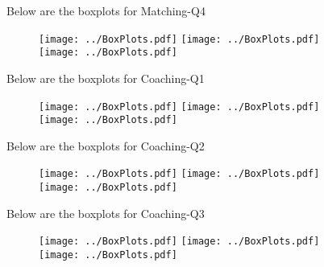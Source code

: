 \documentclass[11pt]{extarticle} %
\begin{document}
\newpage
Below are the boxplots for Matching-Q4
\begin{figure}[H]
\centering 
\texttt{[image: ../BoxPlots.pdf]} 
\texttt{[image: ../BoxPlots.pdf]} \\
\texttt{[image: ../BoxPlots.pdf]} \\
\end{figure}

\newpage
Below are the boxplots for Coaching-Q1
\begin{figure}[H]
\centering 
\texttt{[image: ../BoxPlots.pdf]} 
\texttt{[image: ../BoxPlots.pdf]} \\
\texttt{[image: ../BoxPlots.pdf]} \\
\end{figure}

\newpage
Below are the boxplots for Coaching-Q2
\begin{figure}[H]
\centering 
\texttt{[image: ../BoxPlots.pdf]} 
\texttt{[image: ../BoxPlots.pdf]} \\
\texttt{[image: ../BoxPlots.pdf]} \\
\end{figure}

\newpage
Below are the boxplots for Coaching-Q3
\begin{figure}[H]
\centering 
\texttt{[image: ../BoxPlots.pdf]} 
\texttt{[image: ../BoxPlots.pdf]} \\
\texttt{[image: ../BoxPlots.pdf]} \\
\end{figure}
\end{document}
